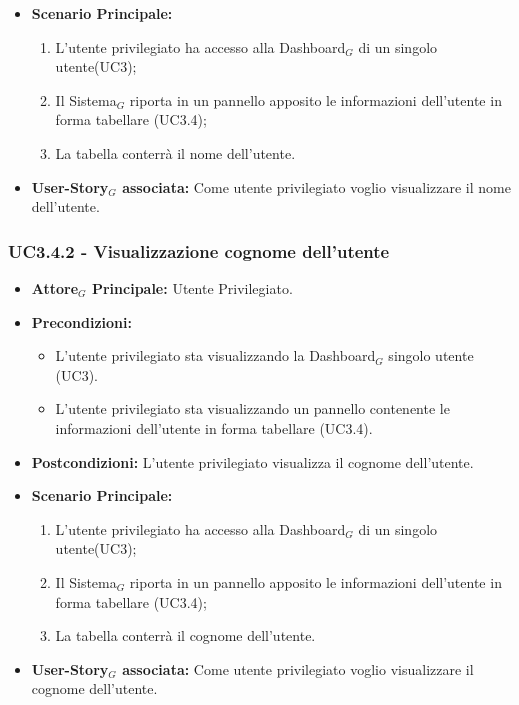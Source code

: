 \documentclass[10pt]{article}
\begin{document}
\begin{justify}
\begin{itemize}
      \item \textbf{Scenario Principale:}
        \begin{enumerate}
            \item L'utente privilegiato ha accesso alla Dashboard$_G$ di un singolo utente(UC3);
            \item Il Sistema$_G$ riporta  in un pannello apposito le informazioni dell'utente in forma tabellare (UC3.4);
            \item La tabella conterrà il nome dell'utente.
        \end{enumerate}
     \item \textbf{User-Story$_G$ associata:}
       Come utente privilegiato voglio visualizzare il nome dell'utente.
\end{itemize}

\subsubsection{\textbf{UC3.4.2 - Visualizzazione cognome dell'utente}}
\label{UC3.4.2}
\begin{itemize}
     \item \textbf{Attore$_G$ Principale:} Utente Privilegiato.
     \item \textbf{Precondizioni:}
        \begin{itemize}
    	\item L'utente privilegiato sta visualizzando la Dashboard$_G$ singolo utente (UC3).
          \item L'utente privilegiato sta visualizzando un pannello contenente le informazioni dell'utente in forma tabellare (UC3.4).
        \end{itemize}
      \item \textbf{Postcondizioni:} L'utente privilegiato visualizza il cognome dell'utente. 
      \item \textbf{Scenario Principale:}
        \begin{enumerate}
            \item L'utente privilegiato ha accesso alla Dashboard$_G$ di un singolo utente(UC3);
            \item Il Sistema$_G$ riporta  in un pannello apposito le informazioni dell'utente in forma tabellare (UC3.4);
            \item La tabella conterrà il cognome dell'utente.
        \end{enumerate}
     \item \textbf{User-Story$_G$ associata:}
       Come utente privilegiato voglio visualizzare il cognome dell'utente.
\end{itemize}


\end{justify}
\end{document}
